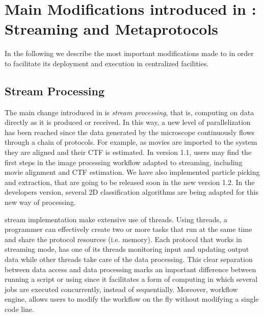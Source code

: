 \section{Main Modifications introduced in  \scipion: Streaming and Metaprotocols}
\label{overall}

In the following we describe the most important modifications made to \scipion in order to facilitate its deployment and execution in centralized facilities.

\subsection{Stream Processing}
The main change introduced in \scipion is \emph{stream processing}, that is, computing on data directly as it is produced or received.
In this way, a new level of parallelization has been reached since the  data generated by the microscope continuously flows through a chain of protocols. For example, as movies are imported to the system they are aligned and their CTF is estimated. In \scipion version 1.1, users may find  the first steps in the image processing workflow adapted to streaming, including movie alignment and CTF estimation. We have also implemented particle picking and extraction, that are going to be released soon in the new version 1.2. In the developers version, several 2D classification algorithms are being adapted for this new way of processing.

\scipion stream implementation make extensive use of threads. %
Using threads, a programmer can effectively create two or more tasks that run at the same time and share the protocol resources (i.e. memory). 
Each protocol that works in streaming mode, has one of its threads monitoring input and updating output  data while other threads take care of the data processing. This clear separation between data access and data processing marks an important difference between running a script or using \scipion since it facilitates a form of computing in which several jobs are executed  concurrently, instead of sequentially. Moreover, \scipion workflow engine, allows users to modify the workflow on the fly without modifying a single code line.

